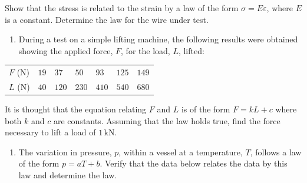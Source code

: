 \documentclass[
  english,
  12pt,
  oneside]{book}
\newcounter{none} %
\providecommand{\tightlist}{%
  \setlength{\itemsep}{0pt}\setlength{\parskip}{0pt}}
\theoremstyle{definition}
\theoremstyle{definition}
\theoremstyle{definition}
\theoremstyle{definition}
\theoremstyle{remark}
\begin{document}
Show that the stress is related to the strain by a law of the form \(\sigma=E\varepsilon\), where \(E\) is a constant.
Determine the law for the wire under test.

\begin{enumerate}
\def\labelenumi{\arabic{enumi}.}
\setcounter{enumi}{1}
\tightlist
\item
  During a test on a simple lifting machine, the following results were obtained showing the
  applied force, \(F\), for the load, \(L\), lifted:
\end{enumerate}

{\def\LTcaptype{none} %
\begin{longtable}[]{@{}
  >{\raggedright\arraybackslash}p{}
  >{\raggedright\arraybackslash}p{}
  >{\raggedright\arraybackslash}p{}
  >{\raggedright\arraybackslash}p{}
  >{\raggedright\arraybackslash}p{}
  >{\raggedright\arraybackslash}p{}
  >{\raggedright\arraybackslash}p{}@{}}
\toprule\noalign{}
\endhead
\bottomrule\noalign{}
\endlastfoot
\(F\) (N) & \(19\) & \(37\) & \(50\) & \(93\) & \(125\) & \(149\) \\
\(L\) (N) & \(40\) & \(120\) & \(230\) & \(410\) & \(540\) & \(680\) \\
\end{longtable}
}

It is thought that the equation relating \(F\) and \(L\) is of the form \(F = kL + c\) where both \(k\) and \(c\) are constants. Assuming that the law holds true, find the force necessary to lift a load of \(1\,\mathrm{kN}\).

\begin{enumerate}
\def\labelenumi{\arabic{enumi}.}
\setcounter{enumi}{2}
\tightlist
\item
  The variation in pressure, \(p\), within a vessel at a temperature, \(T\), follows a law of the form \(p = aT + b\). Verify that the data below relates the data by this law and determine the law.
\end{enumerate}
\end{document}

